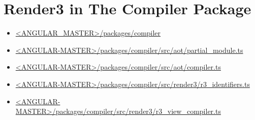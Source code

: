 \section{Render3 in The Compiler Package}


\begin{itemize}
  \item \href{https://github.com/angular/angular/tree/master/packages/compiler/}
        {<ANGULAR\_MASTER>/packages/compiler}
\end{itemize}


\begin{itemize}
  \item \href{https://github.com/angular/angular/blob/master/packages/compiler/src/aot/partial_module.ts}
        {<ANGULAR-MASTER>/packages/compiler/src/aot/partial\_module.ts}
  \item \href{https://github.com/angular/angular/blob/master/packages/compiler/src/aot/compiler.ts}
        {<ANGULAR-MASTER>/packages/compiler/src/aot/compiler.ts}
  \item \href{https://github.com/angular/angular/blob/master/packages/compiler/src/render3/r3_identifiers.ts}
        {<ANGULAR-MASTER>/packages/compiler/src/render3/r3\_identifiers.ts}
  \item \href{https://github.com/angular/angular/blob/master/packages/compiler/src/render3/r3_view_compiler.ts}
        {<ANGULAR-MASTER>/packages/compiler/src/render3/r3\_view\_compiler.ts}
\end{itemize}










